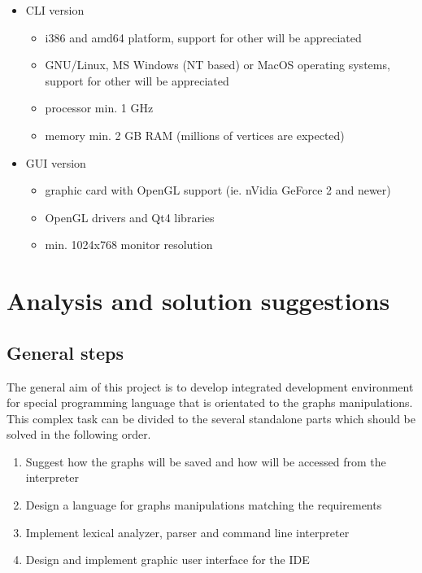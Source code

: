 \documentclass[11pt,twoside,a4paper]{book}
\begin{document}
\begin{itemize}
	\item CLI version
		\begin{itemize}
		\item i386 and amd64 platform, support for other will be appreciated
		\item GNU/Linux, MS Windows (NT based) or MacOS operating systems, support for other will be appreciated
		\item processor min. 1 GHz
		\item memory min. 2 GB RAM (millions of vertices are expected)
		\end{itemize}

	\item GUI version
		\begin{itemize}
		\item graphic card with OpenGL support (ie. nVidia GeForce 2 and newer)
		\item OpenGL drivers and Qt4 libraries
		\item min. 1024x768 monitor resolution
		\end{itemize}
\end{itemize}



\chapter{Analysis and solution suggestions}


\section{General steps}

The general aim of this project is to develop integrated development environment for special programming language that is orientated to the graphs manipulations. This complex task can be divided to the several standalone parts which should be solved in the following order.

\begin{enumerate}
\item Suggest how the graphs will be saved and how will be accessed from the interpreter
\item Design a language for graphs manipulations matching the requirements
\item Implement lexical analyzer, parser and command line interpreter
\item Design and implement graphic user interface for the IDE
\end{enumerate}
\end{document}
